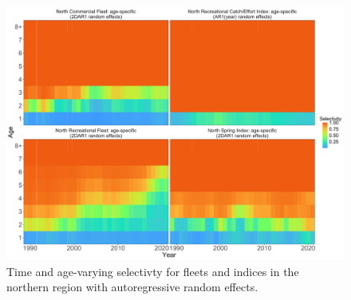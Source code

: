 \documentclass[
]{article}
\begin{document}
\begin{figure}

{\centering \includegraphics[height=0.95\textheight]{selectivity_re_plot} 

}

\caption{Time and age-varying selectivty for fleets and indices in the northern region with autoregressive random effects.}\label{fig:selectivity-re}
\end{figure}
\pagebreak
\end{document}
